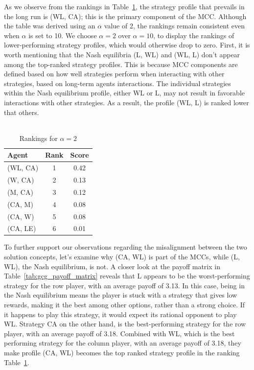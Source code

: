 \begin{flushleft}
\begin{flushleft}
        As we observe from the rankings in Table~\ref{tab:ranking_table}, the strategy profile that prevails in the long run is (WL, CA); this is the primary component of the MCC. Although the table was derived using an $\alpha$ value of 2, the rankings remain consistent even when $\alpha$ is set to 10. We choose $\alpha=2$ over $\alpha=10$, to display the rankings of lower-performing strategy profiles, which would otherwise drop to zero. First, it is worth mentioning that the Nash equilibria (L, WL) and (WL, L) don't appear among the top-ranked strategy profiles. This is because MCC components are defined based on how well strategies perform when interacting with other strategies, based on long-term agents interactions. The individual strategies within the Nash equilibrium profile, either WL or L, may not result in favorable interactions with other strategies. As a result, the profile (WL, L) is ranked lower that others.\\~\\
        \begin{table}[H]
            \centering
            \caption{Rankings for $\alpha=2$}
            \label{tab:ranking_table}
            \vspace{0.5em}
            \begin{tabular}{lcc}
                \hline
                \textbf{Agent} & \textbf{Rank} & \textbf{Score} \\
                \hline
                (WL, CA) & 1 & 0.42 \\
                (W, CA) & 2 & 0.13 \\
                (M, CA) & 3 & 0.12 \\
                (CA, M) & 4 & 0.08 \\
                (CA, W) & 5 & 0.08 \\
                (CA, LE) & 6 & 0.01 \\
                \hline
            \end{tabular}
        \end{table}

        To further support our observations regarding the misalignment between the two solution concepts, let's examine why (CA, WL) is part of the MCCs, while (L, WL), the Nash equilibrium, is not. A closer look at the payoff matrix in Table~\ref{tab:gcg_payoff_matrix} reveals that L appears to be the worst-performing strategy for the row player, with an average payoff of 3.13. In this case, being in the Nash equilibrium means the player is stuck with a strategy that gives low rewards, making it the best among other options, rather than a strong choice. If it happens to play this strategy, it would expect its rational opponent to play WL. Strategy CA on the other hand, is the best-performing strategy for the row player, with an average payoff of 3.18. Combined with WL, which is the best performing strategy for the column player, with an average payoff of 3.18, they make profile (CA, WL) becomes the top ranked strategy profile in the ranking Table~\ref{tab:ranking_table}.\\~\\


\end{flushleft}
\end{flushleft}
